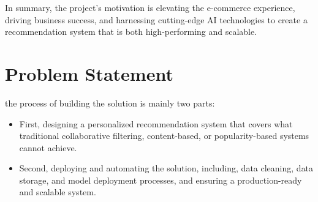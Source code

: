 In summary, the project's motivation is elevating the e-commerce experience, driving business success, and harnessing cutting-edge AI technologies to create a recommendation system that is both high-performing and scalable.

\section{Problem Statement}

the process of building the solution is mainly two parts:

\begin{itemize}
    \item First, designing a personalized recommendation system that covers what traditional collaborative filtering, content-based, or popularity-based systems cannot achieve.
    \item Second, deploying and automating the solution, including, data cleaning, data storage, and model deployment processes, and ensuring a production-ready and scalable system.
\end{itemize}




